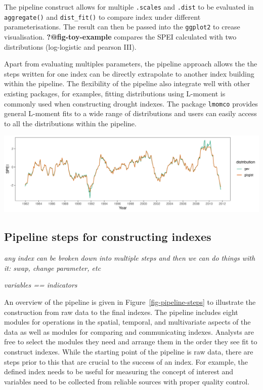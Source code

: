 \documentclass[
]{interact}
\begin{document}
The pipeline construct allows for multiple \texttt{.scales} and
\texttt{.dist} to be evaluated in \texttt{aggregate()} and
\texttt{dist\_fit()} to compare index under different parameterisations.
The result can then be passed into the \texttt{ggplot2} to crease
visualisation. \textbf{?@fig-toy-example} compares the SPEI calculated
with two distributions (log-logistic and pearson III).

Apart from evaluating multiples parameters, the pipeline approach allows
the the steps written for one index can be directly extrapolate to
another index building within the pipeline. The flexibility of the
pipeline also integrate well with other existing packages, for examples,
fitting distributions using L-moment is commonly used when constructing
drought indexes. The package \texttt{lmomco} provides general L-moment
fits to a wide range of distributions and users can easily access to all
the distributions within the pipeline.

\includegraphics[width=1\textwidth,height=\textheight]{figures/toy-example-spei.png}

\hypertarget{pipeline-steps-for-constructing-indexes}{%
\subsection{Pipeline steps for constructing
indexes}\label{pipeline-steps-for-constructing-indexes}}

\emph{any index can be broken down into multiple steps and then we can
do things with it: swap, change parameter, etc}

\emph{variables == indicators}

An overview of the pipeline is given in Figure~\ref{fig-pipeline-steps}
to illustrate the construction from raw data to the final indexes. The
pipeline includes eight modules for operations in the spatial, temporal,
and multivariate aspects of the data as well as modules for comparing
and communicating indexes. Analysts are free to select the modules they
need and arrange them in the order they see fit to construct indexes.
While the starting point of the pipeline is raw data, there are steps
prior to this that are crucial to the success of an index. For example,
the defined index needs to be useful for measuring the concept of
interest and variables need to be collected from reliable sources with
proper quality control.
\end{document}
